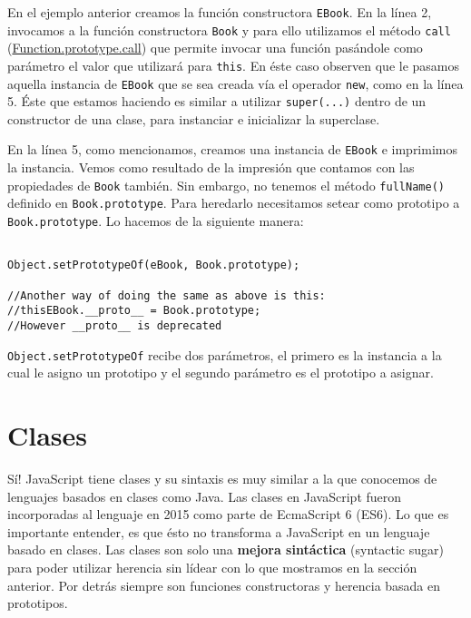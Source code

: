 \documentclass[a4paper, oneside, titlepage, 12pt]{paper}
\begin{document}
En el ejemplo anterior creamos la función constructora \texttt{EBook}. En la línea 2, invocamos a la función constructora \texttt{Book} y para ello utilizamos el método \texttt{call} (\href{https://developer.mozilla.org/es/docs/Web/JavaScript/Reference/Global_Objects/Function/call}{Function.prototype.call}) que permite invocar una función pasándole como parámetro el valor que utilizará para \texttt{this}. En éste caso observen que le pasamos aquella instancia de \texttt{EBook} que se sea creada vía el operador \texttt{new}, como en la línea 5. Éste que estamos haciendo es similar a utilizar \texttt{super(...)} dentro de un constructor de una clase, para instanciar e inicializar la superclase. 
\newline

En la línea 5, como mencionamos, creamos una instancia de \texttt{EBook} e imprimimos la instancia. Vemos como resultado de la impresión que contamos con las propiedades de \texttt{Book} también. Sin embargo, no tenemos el método \texttt{fullName()} definido en \texttt{Book.prototype}. Para heredarlo necesitamos setear como prototipo a \texttt{Book.prototype}. Lo hacemos de la siguiente manera:

\begin{verbatim}

Object.setPrototypeOf(eBook, Book.prototype);

//Another way of doing the same as above is this:
//thisEBook.__proto__ = Book.prototype;
//However __proto__ is deprecated
\end{verbatim}

\texttt{Object.setPrototypeOf} recibe dos parámetros, el primero es la instancia a la cual le asigno un prototipo y el segundo parámetro es el prototipo a asignar.

\section{Clases}

Sí! JavaScript tiene clases y su sintaxis es muy similar a la que conocemos de lenguajes basados en clases como Java. Las clases en JavaScript fueron incorporadas al lenguaje en 2015 como parte de EcmaScript 6 (ES6). Lo que es importante entender, es que ésto no transforma a JavaScript en un lenguaje basado en clases. Las clases son solo una \textbf{mejora sintáctica} (syntactic sugar) para poder utilizar herencia sin lídear con lo que mostramos en la sección anterior. Por detrás siempre son funciones constructoras y herencia basada en prototipos.
\newline
\end{document}
